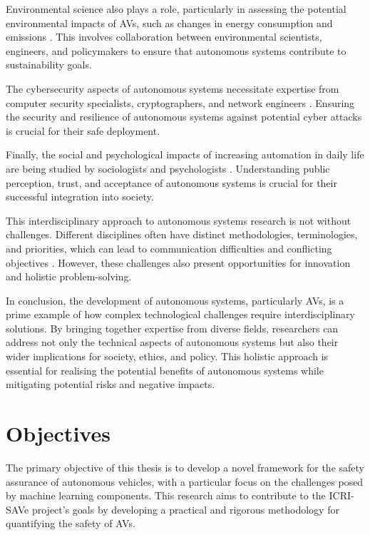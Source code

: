Environmental science also plays a role, particularly in assessing the potential environmental impacts of AVs, such as changes in energy consumption and emissions \cite{Greenblatt2015}. This involves collaboration between environmental scientists, engineers, and policymakers to ensure that autonomous systems contribute to sustainability goals.

The cybersecurity aspects of autonomous systems necessitate expertise from computer security specialists, cryptographers, and network engineers \cite{Loukas2018}. Ensuring the security and resilience of autonomous systems against potential cyber attacks is crucial for their safe deployment.

Finally, the social and psychological impacts of increasing automation in daily life are being studied by sociologists and psychologists \cite{Hancock2020}. Understanding public perception, trust, and acceptance of autonomous systems is crucial for their successful integration into society.

This interdisciplinary approach to autonomous systems research is not without challenges. Different disciplines often have distinct methodologies, terminologies, and priorities, which can lead to communication difficulties and conflicting objectives \cite{Stilgoe2018}. However, these challenges also present opportunities for innovation and holistic problem-solving.

In conclusion, the development of autonomous systems, particularly AVs, is a prime example of how complex technological challenges require interdisciplinary solutions. By bringing together expertise from diverse fields, researchers can address not only the technical aspects of autonomous systems but also their wider implications for society, ethics, and policy. This holistic approach is essential for realising the potential benefits of autonomous systems while mitigating potential risks and negative impacts.

\section{Objectives}

The primary objective of this thesis is to develop a novel framework for the safety assurance of autonomous vehicles, with a particular focus on the challenges posed by machine learning components. This research aims to contribute to the ICRI-SAVe project's goals by developing a practical and rigorous methodology for quantifying the safety of AVs.

